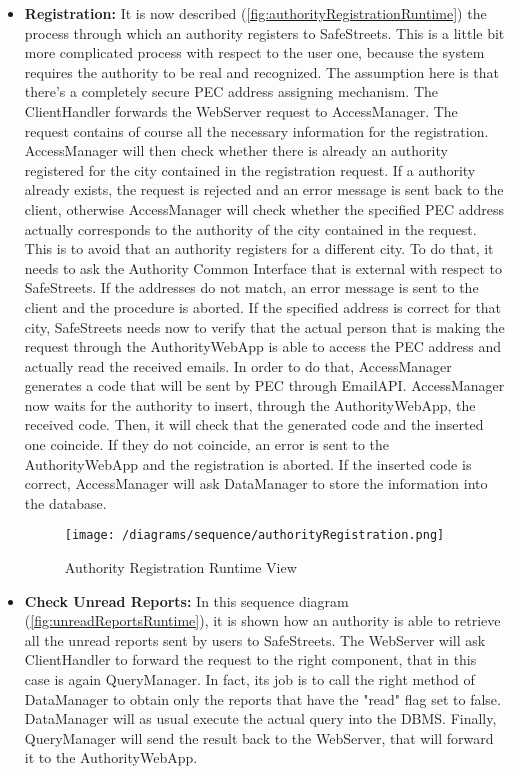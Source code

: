 			\begin{itemize}
				\item \textbf{Registration:} It is now described (\autoref{fig:authorityRegistrationRuntime}) the process through which an authority registers to SafeStreets. This is a little bit more complicated process with respect to the user one, because the system requires the authority to be real and recognized. The assumption here is that there's a completely secure PEC address assigning mechanism. The ClientHandler forwards the WebServer request to AccessManager. The request contains of course all the necessary information for the registration. AccessManager will then check whether there is already an authority registered for the city contained in the registration request. If a authority already exists, the request is rejected and an error message is sent back to the client, otherwise AccessManager will check whether the specified PEC address actually corresponds to the authority of the city contained in the request. This is to avoid that an authority registers for a different city. To do that, it needs to ask the Authority Common Interface that is external with respect to SafeStreets. If the addresses do not match, an error message is sent to the client and the procedure is aborted. If the specified address is correct for that city, SafeStreets needs now to verify that the actual person that is making the request through the AuthorityWebApp is able to access the PEC address and actually read the received emails. In order to do that, AccessManager generates a code that will be sent by PEC through EmailAPI. AccessManager now waits for the authority to insert, through the AuthorityWebApp, the received code. Then, it will check that the generated code and the inserted one coincide. If they do not coincide, an error is sent to the AuthorityWebApp and the registration is aborted. If the inserted code is correct, AccessManager will ask DataManager to store the information into the database.
				
				\begin{figure}[h!]
					\centering
					\texttt{[image: /diagrams/sequence/authorityRegistration.png]}
					\caption{\label{fig:authorityRegistrationRuntime} Authority Registration Runtime View}
				\end{figure}
			
				\item \textbf{Check Unread Reports:} In this sequence diagram (\autoref{fig:unreadReportsRuntime}), it is shown how an authority is able to retrieve all the unread reports sent by users to SafeStreets. The WebServer will ask ClientHandler to forward the request to the right component, that in this case is again QueryManager. In fact, its job is to call the right method of DataManager to obtain only the reports that have the "read" flag set to false. DataManager will as usual execute the actual query into the DBMS. Finally, QueryManager will send the result back to the WebServer, that will forward it to the AuthorityWebApp.
				

\end{itemize}
